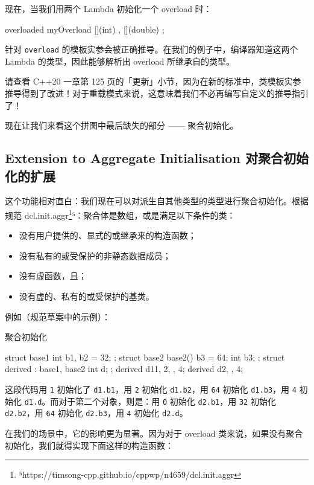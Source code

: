 现在，当我们用两个 Lambda 初始化一个 overload 时：

\begin{codebox}
overloaded myOverload { [](int) { }, [](double) { } };
\end{codebox}

针对 \texttt{overload} 的模板实参会被正确推导。在我们的例子中，编译器知道这两个 Lambda 的类型，因此能够解析出 overload 所继承自的类型。


请查看 C++20 一章第 125 页的「更新」小节，因为在新的标准中，类模板实参推导得到了改进！对于重载模式来说，这意味着我们不必再编写自定义的推导指引了！

现在让我们来看这个拼图中最后缺失的部分 —— 聚合初始化。

\subsection{Extension to Aggregate Initialisation 对聚合初始化的扩展}

这个功能相对直白：我们现在可以对派生自其他类型的类型进行聚合初始化。根据规范 dcl.init.aggr\footnote{⁵https://timsong-cpp.github.io/cppwp/n4659/dcl.init.aggr}⁵：聚合体是数组，或是满足以下条件的类：

\begin{itemize}
\item 没有用户提供的、显式的或继承来的构造函数；
\item 没有私有的或受保护的非静态数据成员；
\item 没有虚函数，且；
\item 没有虚的、私有的或受保护的基类。
\end{itemize}

例如（规范草案中的示例）：

聚合初始化

\begin{codebox}
struct base1 { int b1, b2 = 32; };
struct base2 {
base2() { b3 = 64; }
int b3;
};
struct derived : base1, base2 {
int d;
};
derived d1{{1, 2}, {}, 4};
derived d2{{}, {}, 4};
\end{codebox}

这段代码用 \texttt{1} 初始化了 \texttt{d1.b1}，用 \texttt{2} 初始化 \texttt{d1.b2}，用 \texttt{64} 初始化 \texttt{d1.b3}，用 \texttt{4} 初始化 \texttt{d1.d}。而对于第二个对象，则是：用 \texttt{0} 初始化 \texttt{d2.b1}，用 \texttt{32} 初始化 \texttt{d2.b2}，用 \texttt{64} 初始化 \texttt{d2.b3}，用 \texttt{4} 初始化 \texttt{d2.d}。

在我们的场景中，它的影响更为显著。因为对于 overload 类来说，如果没有聚合初始化，我们就得实现下面这样的构造函数：

